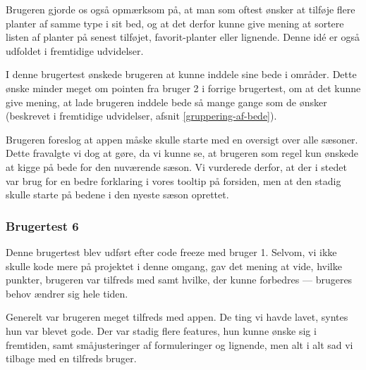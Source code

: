 Brugeren gjorde os også opmærksom på, at man som oftest ønsker at tilføje flere planter af samme type i sit bed, og at det derfor kunne give mening at sortere listen af planter på senest tilføjet, favorit-planter eller lignende. Denne idé er også udfoldet i fremtidige udvidelser.

I denne brugertest ønskede brugeren at kunne inddele sine bede i områder. Dette ønske minder meget om pointen fra bruger 2 i forrige brugertest, om at det kunne give mening, at lade brugeren inddele bede så mange gange som de ønsker (beskrevet i fremtidige udvidelser, afsnit \ref{gruppering-af-bede}).

Brugeren foreslog at appen måske skulle starte med en oversigt over alle sæsoner. Dette fravalgte vi dog at gøre, da vi kunne se, at brugeren som regel kun ønskede at kigge på bede for den nuværende sæson. Vi vurderede derfor, at der i stedet var brug for en bedre forklaring i vores tooltip på forsiden, men at den stadig skulle starte på bedene i den nyeste sæson oprettet.

\subsubsection{Brugertest 6}
Denne brugertest blev udført efter code freeze med bruger 1. Selvom, vi ikke skulle kode mere på projektet i denne omgang, gav det mening at vide, hvilke punkter, brugeren var tilfreds med samt hvilke, der kunne forbedres --- brugeres behov ændrer sig hele tiden.

Generelt var brugeren meget tilfreds med appen. De ting vi havde lavet, syntes hun var blevet gode. Der var stadig flere features, hun kunne ønske sig i fremtiden, samt småjusteringer af formuleringer og lignende, men alt i alt sad vi tilbage med en tilfreds bruger.
